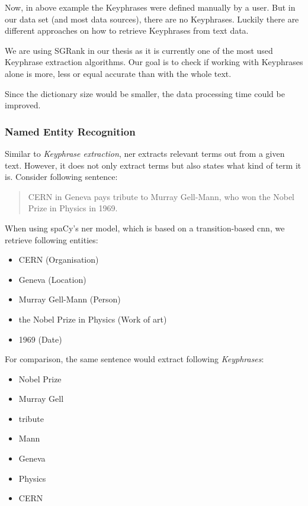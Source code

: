 Now, in above example the Keyphrases were defined manually by a user.
But in our data set (and most data sources), there are no Keyphrases.
Luckily there are different approaches on how to retrieve Keyphrases from text data.

We are using SGRank\cite{SGRank} in our thesis as it is currently one of the most used
Keyphrase extraction algorithms.
Our goal is to check if working with Keyphrases alone is more, less or equal accurate
than with the whole text.

Since the dictionary size would be smaller, the data processing time could be improved.

\subsubsection{Named Entity Recognition}
\label{sec:named_entity_recognition}
Similar to \textit{Keyphrase extraction}, \gls{ner} extracts relevant terms out from a given text.
However, it does not only extract terms but also states what kind of term it is.
Consider following sentence:

\begin{quotation}
    CERN in Geneva pays tribute to Murray Gell-Mann, who won the Nobel Prize in Physics in 1969.
\end{quotation}

When using spaCy's \gls{ner} model, which is based on a transition-based \gls{cnn}\cite{LampleBSKD16},
we retrieve following entities:

\begin{itemize}
    \item CERN (Organisation)
    \item Geneva (Location)
    \item Murray Gell-Mann (Person)
    \item the Nobel Prize in Physics (Work of art)
    \item 1969 (Date)
\end{itemize}

For comparison, the same sentence would extract following \textit{Keyphrases}:

\begin{itemize}
    \item Nobel Prize
    \item Murray Gell
    \item tribute
    \item Mann
    \item Geneva
    \item Physics
    \item CERN
\end{itemize}

